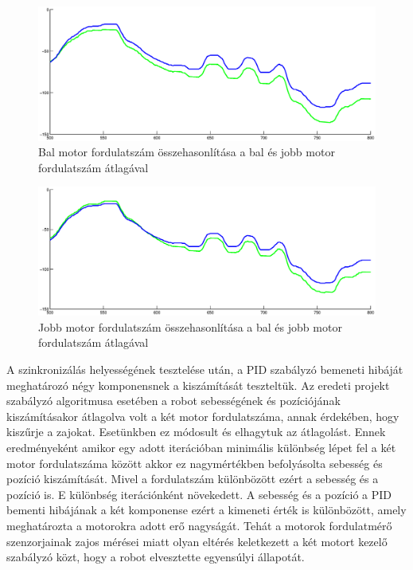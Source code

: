 \begin{figure}[!ht]
	\begin{center}
		\includegraphics[width=1.0\linewidth]{images/balTacho.eps}
	\end{center}
	\caption{Bal motor fordulatszám összehasonlítása a bal és jobb motor fordulatszám átlagával}
	\label{balTachoFig}
\end{figure}

\begin{figure}[!ht]
	\begin{center}
		\includegraphics[width=1.0\linewidth]{images/jobbTacho.eps}
	\end{center}
	\caption{Jobb motor fordulatszám összehasonlítása a bal és jobb motor fordulatszám átlagával}
	\label{jobbTachoFig}
\end{figure}

A szinkronizálás helyességének tesztelése után, a PID szabályzó bemeneti hibáját meghatározó négy komponensnek a kiszámítását teszteltük. Az eredeti projekt szabályzó algoritmusa esetében a robot sebességének és pozíciójának kiszámításakor átlagolva volt a két motor fordulatszáma, annak érdekében, hogy kiszűrje a zajokat. Esetünkben ez módosult és elhagytuk az átlagolást. Ennek eredményeként amikor egy adott iterációban minimális különbség lépet fel a két motor fordulatszáma között akkor ez nagymértékben befolyásolta sebesség és pozíció kiszámítását. Mivel a fordulatszám különbözött ezért a sebesség és a pozíció is. E különbség iterációnként növekedett. A sebesség és a pozíció a PID bementi hibájának a két komponense ezért a kimeneti érték is különbözött, amely meghatározta a motorokra adott erő nagyságát. Tehát a motorok fordulatmérő szenzorjainak zajos mérései miatt olyan eltérés keletkezett a két motort kezelő szabályzó közt, hogy a robot elvesztette egyensúlyi állapotát.


